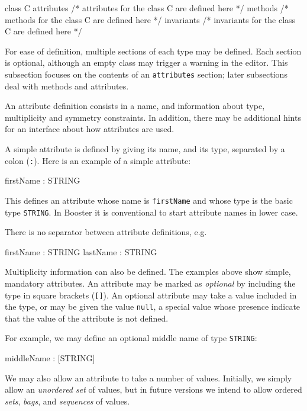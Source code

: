 \begin{code}
class C {
  attributes
    /* attributes for the class C are defined here */
  methods
    /* methods for the class C are defined here */
  invariants
    /* invariants for the class C are defined here */
}
\end{code}

For ease of definition, multiple sections of each type may be
defined.  Each section is optional, although an empty class may
trigger a warning in the editor.  This subsection focuses on the
contents of an \verb|attributes| section; later subsections deal with
methods and attributes.

An attribute definition consists in a name, and information about
type, multiplicity and symmetry constraints.  In addition, there may
be additional hints for an interface about how attributes are used.

A simple attribute is defined by giving its name, and its type,
separated by a colon (\verb|:|).  Here is an example of a simple
attribute:

\begin{code}
  firstName : STRING
\end{code}

This defines an attribute whose name is \verb|firstName| and whose
type is the basic type \verb|STRING|.  In Booster it is conventional
to start attribute names in lower case.  

There is no separator between attribute definitions, e.g.
\begin{code}
  firstName : STRING
  lastName : STRING
\end{code}

Multiplicity information can also be defined.  The examples above show
simple, mandatory attributes.  An attribute may be marked as
\emph{optional} by including the type in square brackets (\verb|[]|).
An optional attribute may take a value included in the type, or may be
given the value \verb|null|, a special value whose presence indicate
that the value of the attribute is not defined.

For example, we may define an optional middle name of type
\verb|STRING|:

\begin{code}
  middleName : [STRING]
\end{code}

We may also allow an attribute to take a number of values.  Initially,
we simply allow an \emph{unordered set} of values, but in future versions we
intend to allow ordered \emph{sets}, \emph{bags}, and \emph{sequences}
of values. 

